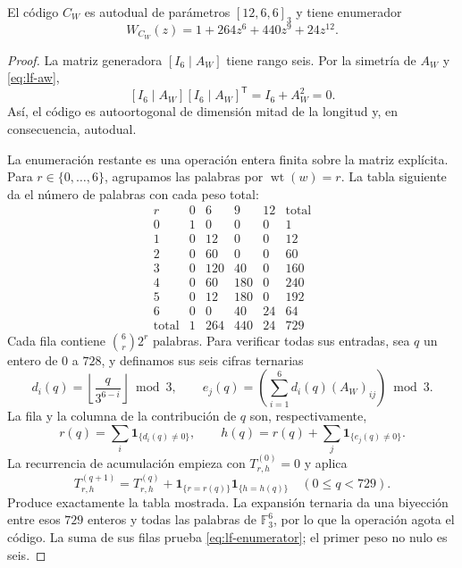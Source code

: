 \begin{theorem}
\label{thm:lf-code}
El código \(C_W\) es autodual de parámetros \([12,6,6]_3\) y
tiene enumerador
\begin{equation}
 W_{C_W}(z)=1+264z^6+440z^9+24z^{12}.
 \label{eq:lf-enumerator}
\end{equation}
\end{theorem}
\begin{proof}
La matriz generadora \([I_6\mid A_W]\) tiene rango seis.
Por la simetría de \(A_W\) y \eqref{eq:lf-aw},
\[
 [I_6\mid A_W][I_6\mid A_W]^{\mathsf T}
       =I_6+A_W^2=0.
\]
Así, el código es autoortogonal de dimensión mitad de la
longitud y, en consecuencia, autodual.

La enumeración restante es una operación entera finita sobre
la matriz explícita. Para \(r\in\{0,\ldots,6\}\), agrupamos
las palabras por \(\operatorname{wt}(w)=r\). La tabla siguiente
da el número de palabras con cada peso total:
\[
\begin{array}{c|rrrr|r}
r&0&6&9&12&\text{total}\\ \hline
0&1&0&0&0&1\\
1&0&12&0&0&12\\
2&0&60&0&0&60\\
3&0&120&40&0&160\\
4&0&60&180&0&240\\
5&0&12&180&0&192\\
6&0&0&40&24&64\\ \hline
\text{total}&1&264&440&24&729
\end{array}
\]
Cada fila contiene \(\binom6r2^r\) palabras. Para verificar
todas sus entradas, sea \(q\) un entero de \(0\) a \(728\), y
definamos sus seis cifras ternarias
\[
 d_i(q)=\left\lfloor\frac{q}{3^{6-i}}\right\rfloor\bmod3,
 \qquad
 e_j(q)=\left(\sum_{i=1}^{6}d_i(q)(A_W)_{ij}\right)\bmod3.
\]
La fila y la columna de la contribución de \(q\) son,
respectivamente,
\[
 r(q)=\sum_i\mathbf1_{\{d_i(q)\ne0\}},\qquad
 h(q)=r(q)+\sum_j\mathbf1_{\{e_j(q)\ne0\}}.
\]
La recurrencia de acumulación empieza con
\(T^{(0)}_{r,h}=0\) y aplica
\[
 T^{(q+1)}_{r,h}
 =T^{(q)}_{r,h}
   +\mathbf1_{\{r=r(q)\}}\mathbf1_{\{h=h(q)\}}
 \quad(0\leq q<729).
\]
Produce exactamente la tabla mostrada. La expansión ternaria
da una biyección entre esos \(729\) enteros y todas las palabras
de \(\mathbb F_3^6\), por lo que la operación agota el código.
La suma de sus filas prueba \eqref{eq:lf-enumerator}; el primer
peso no nulo es seis.
\end{proof}

